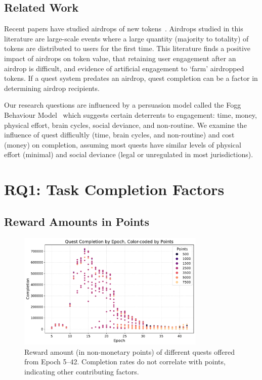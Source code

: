 
\subsection{Related Work}

Recent papers have studied airdrops of new tokens~\cite{FB19,MYL24,YL24}. Airdrops studied in this literature are large-scale events where a large quantity (majority to totality) of tokens are distributed to users for the first time. This literature finds a positive impact of airdrops on token value, that retaining user engagement after an airdrop is difficult, and evidence of artificial engagement to `farm' airdropped tokens. If a quest system predates an airdrop, quest completion can be a factor in determining airdrop recipients. 

Our research questions are influenced by a persuasion model called the Fogg Behaviour Model~\cite{Fogg09} which suggests certain deterrents to engagement: time, money, physical effort, brain cycles, social deviance, and non-routine. We examine the influence of quest difficultly (time, brain cycles, and non-routine) and cost (money) on completion, assuming most quests have similar levels of physical effort (minimal) and social deviance (legal or unregulated in most jurisdictions). 


\section{RQ1: Task Completion Factors}
\subsection{Reward Amounts in Points}

\begin{figure}[t]
    \centering
    \includegraphics[width=0.8\textwidth]{figures/points.pdf}
    \caption{Reward amount (in non-monetary points) of different quests offered from Epoch 5--42. Completion rates do not correlate with points, indicating other contributing factors.\label{fig:points}}
\end{figure}

